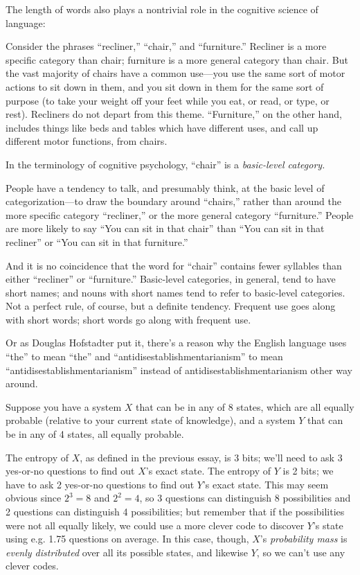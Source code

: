 {
 The length of words also plays a nontrivial role in the cognitive
science of language:}

{
 Consider the phrases
``recliner,''
``chair,'' and
``furniture.'' Recliner is a more
specific category than chair; furniture is a more general category than
chair. But the vast majority of chairs have a common use---you use the
same sort of motor actions to sit down in them, and you sit down in
them for the same sort of purpose (to take your weight off your feet
while you eat, or read, or type, or rest). Recliners do not depart from
this theme. ``Furniture,'' on the
other hand, includes things like beds and tables which have different
uses, and call up different motor functions, from chairs.}

{
 In the terminology of cognitive psychology,
``chair'' is a \textit{basic-level
category.}}

{
 People have a tendency to talk, and presumably think, at the basic
level of categorization---to draw the boundary around
``chairs,'' rather than around the
more specific category ``recliner,''
or the more general category
``furniture.'' People are more
likely to say ``You can sit in that
chair'' than ``You can sit in that
recliner'' or ``You can sit in that
furniture.''}

{
 And it is no coincidence that the word for
``chair'' contains fewer syllables
than either ``recliner'' or
``furniture.'' Basic-level
categories, in general, tend to have short names; and nouns with short
names tend to refer to basic-level categories. Not a perfect rule, of
course, but a definite tendency. Frequent use goes along with short
words; short words go along with frequent use.}

{
 Or as Douglas Hofstadter put it, there's a reason
why the English language uses
``the'' to mean
``the'' and
``antidisestablishmentarianism'' to
mean
``antidisestablishmentarianism''
instead of antidisestablishmentarianism other way around.}

\myendsectiontext


{
 Suppose you have a system $X$ that can be in any of 8 states, which
are all equally probable (relative to your current state of knowledge),
and a system $Y$ that can be in any of 4 states, all equally probable. }

{
 The entropy of $X$, as defined in the previous essay, is 3 bits;
we'll need to ask 3 yes-or-no questions to find out
$X$'s exact state. The entropy of $Y$ is 2 bits; we have to
ask 2 yes-or-no questions to find out $Y$'s exact state.
This may seem obvious since $2^3 = 8$ and
$2^2 = 4$, so 3 questions can distinguish 8
possibilities and 2 questions can distinguish 4 possibilities; but
remember that if the possibilities were not all equally likely, we
could use a more clever code to discover $Y$'s state
using e.g. 1.75 questions on average. In this case, though,
$X$'s \textit{probability mass} is \textit{evenly
distributed} over all its possible states, and likewise $Y$, so we
can't use any clever codes.}

